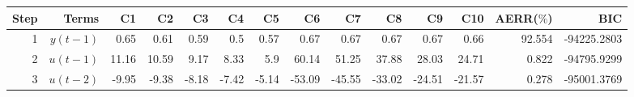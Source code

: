 \begin{tabular}{rrrrrrrrrrrrrr}
Step & Terms & C1 & C2 & C3 & C4 & C5 & C6 & C7 & C8 & C9 & C10 & AERR($\%$) & BIC \\ 
\hline 
1 & $y(t-1)$ & 0.65 & 0.61 & 0.59 & 0.5 & 0.57 & 0.67 & 0.67 & 0.67 & 0.67 & 0.66 & 92.554 & -94225.2803 \\ 
2 & $u(t-1)$ & 11.16 & 10.59 & 9.17 & 8.33 & 5.9 & 60.14 & 51.25 & 37.88 & 28.03 & 24.71 & 0.822 & -94795.9299 \\ 
3 & $u(t-2)$ & -9.95 & -9.38 & -8.18 & -7.42 & -5.14 & -53.09 & -45.55 & -33.02 & -24.51 & -21.57 & 0.278 & -95001.3769 \\ 
\hline 
\end{tabular}